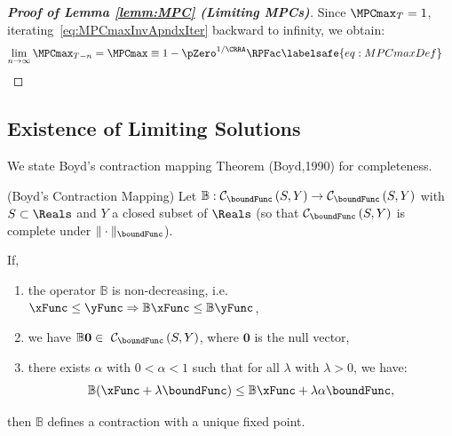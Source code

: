 \documentclass[\econtexRoot/BufferStockTheory]{subfiles}
\begin{document}
\begin{proof}[\textbf{Proof of Lemma \ref{lemm:MPC} (Limiting MPCs)}]
Since $\MPCmax_{T}=1$, iterating~\eqref{eq:MPCmaxInvApndxIter} backward to
infinity, we obtain:
\begin{equation}\begin{gathered}\begin{aligned}
\lim_{n\rightarrow\infty}\MPCmax_{T-n} 
& = \MPCmax \equiv 1-\pZero^{1/\CRRA}\RPFac  \labelsafe{eq:MPCmaxDef}
\end{aligned}\end{gathered}\end{equation}


\end{proof}

\hypertarget{It-Is-A-Contraction-Mapping}{}
\subsection{Existence of Limiting Solutions}\label{sec:Tcontractionmapping}



We state Boyd's contraction mapping Theorem (Boyd,1990) for completeness.

\begin{theorem}(Boyd's Contraction Mapping)\label{thm:Boyd}
Let $\mathbb{B}:\mathcal{C}_{\boundFunc }\left( S,Y\right)
  \rightarrow \mathcal{C}_{\boundFunc }\left(S,Y\right) $ with $S\subset \Reals$ and $Y$ a closed subset of $\Reals$ (so that $\mathcal{C}_{\boundFunc }\left(S,Y\right)$ is complete under $\Vert\cdot\Vert_{\boundFunc}$).

If, 
\begin{enumerate}
  \item the operator $\mathbb{B}$ is non-decreasing, i.e.\ $\xFunc \leq \yFunc \Rightarrow\mathbb{B}{\xFunc } \leq \mathbb{B}{\yFunc}$,
  \item we have $\mathbb{B}\mathbf{0}\in ~ \mathcal{C}_{\boundFunc }\left(S,Y\right) $, where $\mathbf{0}$ is the null vector,
  \item there exists $\alpha$ with $0 < \alpha < 1$ such that for all $\lambda$ with $\lambda > 0$, we have:
             $$\mathbb{B}({\xFunc } +\lambda\boundFunc ) \leq \mathbb{B}{\xFunc } +\lambda\alpha \boundFunc,$$
\end{enumerate}
then $\mathbb{B}$ defines a contraction with a unique fixed point.
\end{theorem}
\end{document}
